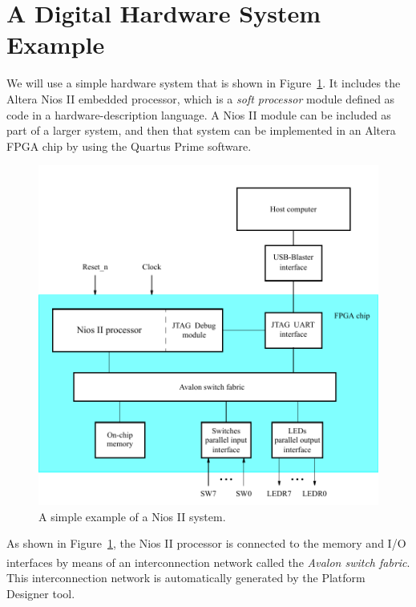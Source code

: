 \documentclass[11pt, twoside, pdftex]{article}
\begin{document}
\section{A Digital Hardware System Example}
We will use a simple hardware system that is shown in Figure~\ref{fig:2}.
It includes the Altera Nios II embedded processor,
which is a {\it soft processor} module defined as code in a hardware-description language.
A Nios II module can be included as part of a larger system, and then that system can
be implemented in an Altera FPGA chip by using the Quartus Prime software.

\begin{figure}[H]
   \begin{center}
      \includegraphics[scale=1]{figures/figure2.pdf}
   \end{center}
   \caption{A simple example of a Nios II system.} 
	\label{fig:2}
\end{figure}

As shown in Figure~\ref{fig:2}, the Nios II processor is connected to the memory and I/O interfaces 
by means of an interconnection network called the {\it Avalon\textsuperscript{\textregistered} switch fabric}.
This interconnection network is automatically generated by the Platform Designer tool.
\end{document}
